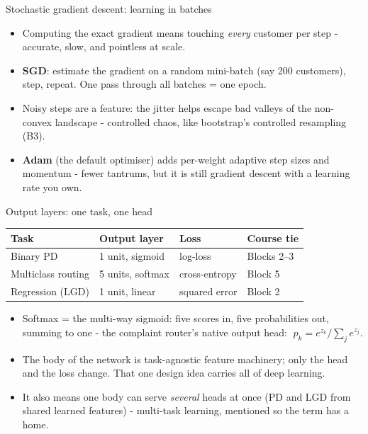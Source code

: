 \documentclass[10pt,aspectratio=169]{beamer}
\begin{document}
\begin{frame}{Stochastic gradient descent: learning in batches}
  \begin{itemize}
    \item Computing the exact gradient means touching \emph{every}
          customer per step - accurate, slow, and pointless at scale.
    \item \textbf{SGD}: estimate the gradient on a random
          \alert{mini-batch} (say 200 customers), step, repeat. One pass
          through all batches = one \alert{epoch}.
    \item Noisy steps are a feature: the jitter helps escape bad valleys
          of the non-convex landscape - controlled chaos, like
          bootstrap's controlled resampling (B3).
    \item \textbf{Adam} (the default optimiser) adds per-weight adaptive
          step sizes and momentum - fewer tantrums, \alert{but it is
          still gradient descent with a learning rate} you own.
  \end{itemize}
\end{frame}

\begin{frame}{Output layers: one task, one head}
  \small
  \begin{center}
  \begin{tabular}{@{}llll@{}}
    \toprule
    Task & Output layer & Loss & Course tie \\
    \midrule
    Binary PD & 1 unit, sigmoid & log-loss & Blocks 2--3 \\
    Multiclass routing & 5 units, \alert{softmax} & cross-entropy & Block 5 \\
    Regression (LGD) & 1 unit, linear & squared error & Block 2 \\
    \bottomrule
  \end{tabular}
  \end{center}
  \vspace{0.5em}
  \begin{itemize}\small
    \item Softmax = the multi-way sigmoid: five scores in, five
          probabilities out, summing to one - the complaint router's
          native output head:
          $\;p_k = e^{z_k} \big/ \sum_j e^{z_j}$.
    \item The body of the network is task-agnostic feature machinery;
          \alert{only the head and the loss change}. That one design idea
          carries all of deep learning.
    \item It also means one body can serve \emph{several} heads at once
          (PD and LGD from shared learned features) - multi-task
          learning, mentioned so the term has a home.
  \end{itemize}
\end{frame}
\end{document}
